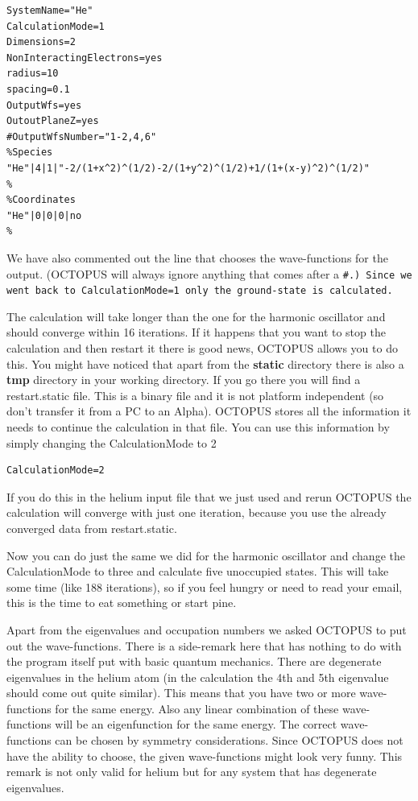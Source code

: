 \documentclass{article}
\begin{document}
\begin{verbatim}
SystemName="He"
CalculationMode=1
Dimensions=2
NonInteractingElectrons=yes
radius=10
spacing=0.1
OutputWfs=yes
OutoutPlaneZ=yes
#OutputWfsNumber="1-2,4,6"
%Species
"He"|4|1|"-2/(1+x^2)^(1/2)-2/(1+y^2)^(1/2)+1/(1+(x-y)^2)^(1/2)"
%
%Coordinates
"He"|0|0|0|no
%
\end{verbatim}

We have also commented out the line that chooses the wave-functions for the
output. (OCTOPUS will always ignore anything that comes after a \tt \#\rm.)
Since we went back to CalculationMode=1 only the ground-state is calculated. 

The calculation will take longer than the one for the harmonic oscillator and
should converge within 16 iterations. If it happens that you want to stop the
calculation and then restart it there is good news, OCTOPUS allows you to do
this. You might have noticed that apart from the {\bf static} directory there is
also a {\bf tmp} directory in your working directory. If you go there you will
find a restart.static file. This is a binary file and it is not platform
independent (so don't transfer it from a PC to an Alpha). OCTOPUS stores all the
information it needs to continue the calculation in that file. You can use this
information by simply changing the CalculationMode to 2

\begin{verbatim}
CalculationMode=2
\end{verbatim}

If you do this in the helium input file that we just used and rerun OCTOPUS the
calculation will converge with just one iteration, because you use the already
converged data from restart.static.

Now you can do just the same we did for the harmonic oscillator and change the
CalculationMode to three and calculate five unoccupied states. This will take
some time (like 188 iterations), so if you feel hungry or need to read your
email, this is the time to eat something or start pine. 

Apart from the eigenvalues and occupation numbers we asked OCTOPUS to put out
the wave-functions. There is a side-remark here that has nothing to do with the
program itself put with basic quantum mechanics. There are degenerate
eigenvalues in the helium atom (in the calculation the 4th and 5th eigenvalue
should come out quite similar). This means that you have two or more
wave-functions for the same energy. Also any linear combination of these
wave-functions will be an eigenfunction for the same energy. The correct
wave-functions can be chosen by symmetry considerations. Since OCTOPUS does not
have the ability to choose, the given wave-functions might look very funny.
This remark is not only valid for helium but for any system that has degenerate
eigenvalues.
\end{document}
